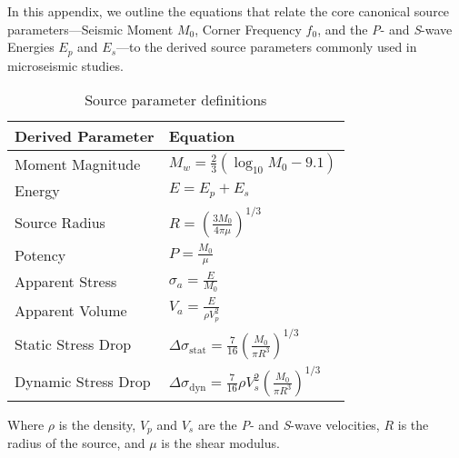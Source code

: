\label{sec:app_source_params}

In this appendix, we outline the equations that relate the core canonical source parameters—Seismic Moment $M_0$, Corner Frequency $f_0$, and the \textit{P}- and \textit{S}-wave Energies $E_p$ and $E_s$—to the derived source parameters commonly used in microseismic studies.

\begin{table}[h]
    \centering
    \caption{Source parameter definitions}
    \label{tab:source_parameters}
    \renewcommand{\arraystretch}{2} %
    \begin{tabular}{ll}
        \textbf{Derived Parameter} & \textbf{Equation} \\
        \hline
        Moment Magnitude    & $M_w = \frac{2}{3} \left( \log_{10} M_0 - 9.1 \right)$ \\
        Energy              & $E = E_p + E_s$ \\
        Source Radius       & $R = \left(\frac{3M_0}{4\pi\mu}\right)^{1/3}$ \\
        Potency             & $P = \frac{M_0}{\mu}$ \\
        Apparent Stress     & $\sigma_a = \frac{E}{M_0}$ \\
        Apparent Volume     & $V_a = \frac{E}{\rho V_p^2}$ \\
        Static Stress Drop  & $\Delta\sigma_{\text{stat}} = \frac{7}{16} \left(\frac{M_0}{\pi R^3}\right)^{1/3}$ \\
        Dynamic Stress Drop & $\Delta\sigma_{\text{dyn}} = \frac{7}{16} \rho V_s^2 \left(\frac{M_0}{\pi R^3}\right)^{1/3}$ \\
        \hline
    \end{tabular}
\end{table}

Where $\rho$ is the density, $V_p$ and $V_s$ are the \textit{P}- and \textit{S}-wave velocities, $R$ is the radius of the source, and $\mu$ is the shear modulus.

